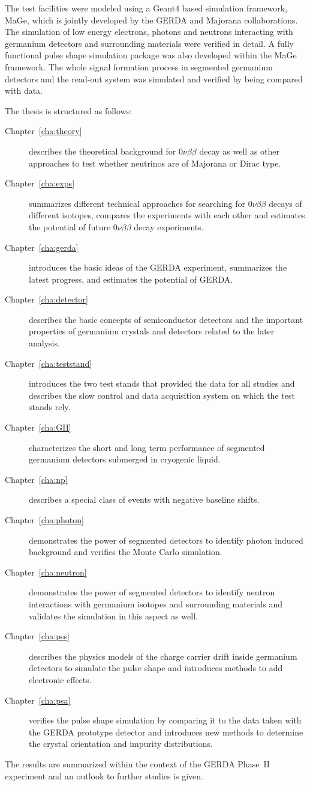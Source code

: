 The test facilities were modeled using a Geant4 based simulation
framework, MaGe, which is jointly developed by the GERDA and Majorana
collaborations. The simulation of low energy electrons, photons and
neutrons interacting with germanium detectors and surrounding
materials were verified in detail. A fully functional pulse shape
simulation package was also developed within the MaGe framework. The
whole signal formation process in segmented germanium detectors and
the read-out system was simulated and verified by being compared with
data.

The thesis is structured as follows:
\begin{description}
\item[Chapter~\ref{cha:theory}] describes the theoretical background
for $0\nu\beta\beta$ decay as well as other approaches to test whether
neutrinos are of Majorana or Dirac type.
\item[Chapter~\ref{cha:exps}] summarizes different technical
approaches for searching for $0\nu\beta\beta$ decays of different
isotopes, compares the experiments with each other and estimates the
potential of future $0\nu\beta\beta$ decay experiments.
\item[Chapter~\ref{cha:gerda}] introduces the basic ideas of the GERDA
experiment, summarizes the latest progress, and estimates the
potential of GERDA.
\item[Chapter~\ref{cha:detector}] describes the basic concepts of
semiconductor detectors and the important properties of germanium
crystals and detectors related to the later analysis.
\item[Chapter~\ref{cha:teststand}] introduces the two test stands that
provided the data for all studies and describes the slow control and
data acquisition system on which the test stands rely.
\item[Chapter~\ref{cha:GII}] characterizes the short and long term
performance of segmented germanium detectors submerged in cryogenic
liquid.
\item[Chapter~\ref{cha:np}] describes a special class of events with
negative baseline shifts.
\item[Chapter~\ref{cha:photon}] demonstrates the power of segmented
detectors to identify photon induced background and verifies the Monte
Carlo simulation.
\item[Chapter~\ref{cha:neutron}] demonstrates the power of segmented
detectors to identify neutron interactions with germanium isotopes and
surrounding materials and validates the simulation in this aspect as
well.
\item[Chapter~\ref{cha:pss}] describes the physics models of the
charge carrier drift inside germanium detectors to simulate the pulse
shape and introduces methods to add electronic effects.
\item[Chapter~\ref{cha:psa}] verifies the pulse shape simulation by
comparing it to the data taken with the GERDA prototype detector and
introduces new methods to determine the crystal orientation and
impurity distributions.
\end{description}
The results are summarized within the context of the GERDA Phase~II
experiment and an outlook to further studies is given.


